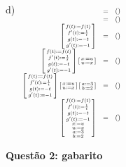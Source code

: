 \documentclass[oneside,12pt]{article}
\begin{document}
d)
%
$\scalebox{0.7}{$
 \begin{array}[t]{rcl}
  \ga{Trilho (1)} &=& \TFCP{\ga{TRILHO (1)}} \\
  \ga{Alface}     &=& \TFCP{\ga{ALFACE}} \\
  \ga{Alface}
     \bsm{
        f(t) := f(t) \\
       f'(t) := \frac{1}{t} \\
        g(t) := -t \\
       g'(t) := -1 \\
          }
                  &=& \TFCP{\ga{ALFACE2}} \\
  \ga{Alface}
     \bsm{
        f(t) := f(t) \\
       f'(t) := \frac{1}{t} \\
        g(t) := -t \\
       g'(t) := -1 \\
          }
     \bsm{ x := u \\ u := x \\ }
                  &=& \TFCP{\ga{ALFACE3}} \\
  \ga{Alface}
     \bsm{
        f(t) := f(t) \\
       f'(t) := \frac{1}{t} \\
        g(t) := -t \\
       g'(t) := -1 \\
          }
     \bsm{ x := u \\ u := x \\ }
     \bsm{ a := 3 \\ b := 2 \\ }
                  &=& \TFCP{\ga{ALFACE4}} \\
  \ga{Alface}
     \bsm{
        f(t) := f(t) \\
       f'(t) := \frac{1}{t} \\
        g(t) := -t \\
       g'(t) := -1 \\
           x := u \\ u := x \\
           a := 3 \\ b := 2 \\ }
                  &=& \TFCP{\ga{ALFACE4}} \\
 \end{array}
 $}
$


\newpage



{\bf Questão 2: gabarito}

\end{document}
